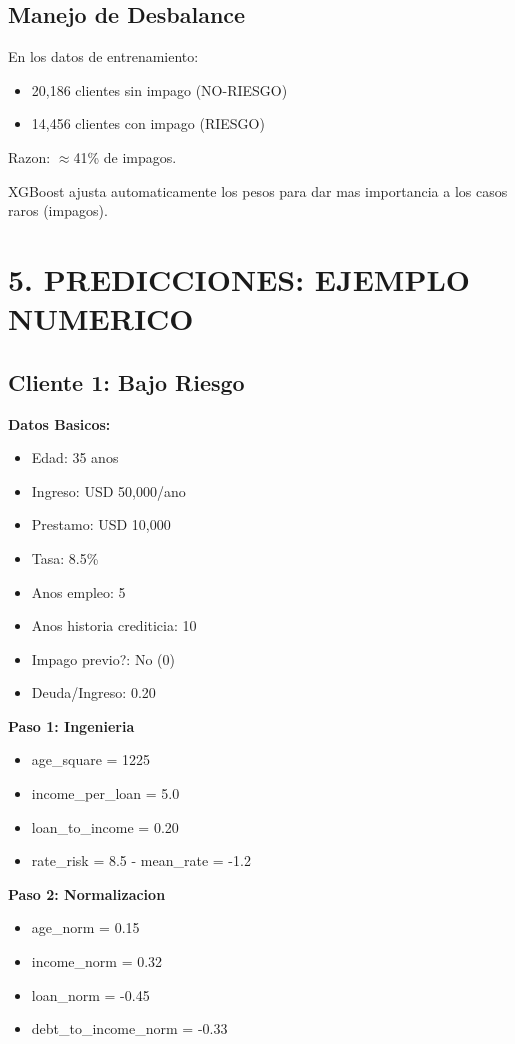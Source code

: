 \documentclass[11pt]{article}
\begin{document}
\subsection*{Manejo de Desbalance}

En los datos de entrenamiento:
\begin{itemize}
\item 20,186 clientes sin impago (NO-RIESGO)
\item 14,456 clientes con impago (RIESGO)
\end{itemize}

Razon: $\approx$41\% de impagos.

XGBoost ajusta automaticamente los pesos para dar mas importancia a los casos raros (impagos).

\section*{5. PREDICCIONES: EJEMPLO NUMERICO}

\subsection*{Cliente 1: Bajo Riesgo}

\textbf{Datos Basicos:}
\begin{itemize}
\item Edad: 35 anos
\item Ingreso: USD 50,000/ano
\item Prestamo: USD 10,000
\item Tasa: 8.5\%
\item Anos empleo: 5
\item Anos historia crediticia: 10
\item Impago previo?: No (0)
\item Deuda/Ingreso: 0.20
\end{itemize}

\textbf{Paso 1: Ingenieria}
\begin{itemize}
\item age\_square = 1225
\item income\_per\_loan = 5.0
\item loan\_to\_income = 0.20
\item rate\_risk = 8.5 - mean\_rate = -1.2
\end{itemize}

\textbf{Paso 2: Normalizacion}
\begin{itemize}
\item age\_norm = 0.15
\item income\_norm = 0.32
\item loan\_norm = -0.45
\item debt\_to\_income\_norm = -0.33
\end{itemize}
\end{document}
